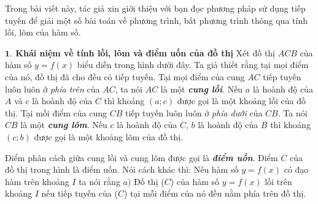 Trong bài viết này, tác giả xin giới thiệu với bạn đọc phương pháp sử dụng tiếp tuyến để giải một số bài toán về phương trình, bất phương trình thông qua tính lồi, lõm của hàm số.

\begin{multicols}{2}
	\textbf{\color{diendantoanhoc}$\pmb{1.}$ Khái niệm về tính lồi, lõm và điểm uốn của đồ thị}
	\vskip 0.1cm
	Xét đồ thị $ACB$ của hàm số $y = f(x)$ biểu diễn trong hình dưới đây. Ta giả thiết rằng tại mọi điểm của nó, đồ thị đã cho đều có tiếp tuyến. Tại mọi điểm của cung $AC$ tiếp tuyến luôn luôn ở \emph{phía trên} của $AC$, ta nói $AC$ là một \textbf{\color{diendantoanhoc}\itshape cung lồi}. Nếu $a$ là hoành độ của $A$ và $c$ là hoành độ của $C$ thì khoảng $(a; c)$ được gọi là một khoảng lồi của đồ thị. Tại mỗi điểm của cung $CB$ tiếp tuyến luôn luôn ở \emph{\itshape phía dưới} của $CB$. Ta nói $CB$ là một \textbf{\color{diendantoanhoc}\itshape cung lõm}. Nếu $c$ là hoành độ của $C$, $b$ là hoành độ của $B$ thì khoảng $(c; b)$ được gọi là một khoảng lõm của đồ thị.
	\begin{center}
	\end{center}
	Điểm phân cách giữa cung lồi và cung lõm được gọi là \textbf{\color{diendantoanhoc}\itshape điểm uốn}. Điểm $C$ của đồ thị trong hình là điểm uốn.
	\vskip 0.1cm
	Nói cách khác thì: 
	Nếu hàm số $y=f(x)$ có đạo hàm trên khoảng $I$ ta nói rằng
	\vskip 0.1cm
	$a)$ Đồ thị ($C$) của hàm số $y = f(x)$ lồi trên khoảng $I$ nếu tiếp tuyến của ($C$) tại mỗi điểm của nó đều nằm phía trên đồ thị.

\end{multicols}
